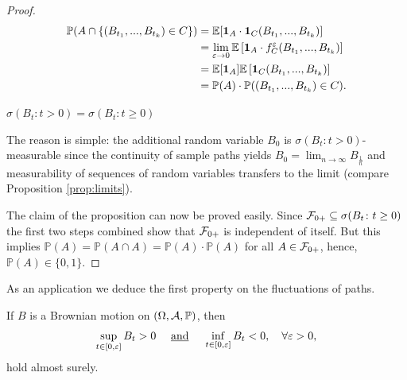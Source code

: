 \begin{proof}[Proof]
	\begin{align*}
		\P(A\cap \{(B_{t_1},...,B_{t_k})\in C\})
		&=\E[ \mathbf 1_A\cdot \mathbf 1_{C}(B_{t_1},...,B_{t_k})]\\
		&=\lim_{\varepsilon \to 0}\E \left[ \mathbf 1_A \cdot f_C^\varepsilon (B_{t_1},...,B_{t_k})\right]\\
		&= \E[\mathbf 1_A] \E \left[ \mathbf 1_C(B_{t_1},...,B_{t_k})\right]\\
		&= \P(A) \cdot \P ((B_{t_1},...,B_{t_k})\in C).
	\end{align*}
	\begin{lstep}
		$\sigma(B_t \colon t > 0)=\sigma(B_t \colon t\geq 0)$
	\end{lstep}
	The reason is simple: the additional random variable $B_0$ is $\sigma(B_t \colon t > 0)$-measurable since the continuity of sample paths yields $B_0 = \lim_{n\to\infty} B_{\frac{1}{n}}$ and measurability of sequences of random variables transfers to the limit (compare Proposition \ref{prop:limits}).\smallskip

	The claim of the proposition can now be proved easily. Since $\cF_{0+}\subseteq \sigma(B_t \colon t\geq 0)$ the first two steps combined show that $\cF_{0+}$ is independent of itself. But this implies $\mathbb{P}(A)= \mathbb{P}(A\cap A) = \mathbb{P}(A)\cdot \mathbb{P}(A)$ for all $A\in \cF_{0+}$, hence, $\mathbb{P}(A)\in \{0,1\}$.
\end{proof}
As an application we deduce the first property on the fluctuations of paths. 
\begin{laussagewerkzeug}
\begin{corollary}\label{kor_sup}
	If $B$ is a Brownian motion on $(\Omega, \mathcal A, \P)$, then
	\begin{align*}
		\sup_{t\in [0,\varepsilon]} B_t > 0\quad \text{ \underline{and} }\quad  \inf_{t \in [0,\varepsilon]} B_t < 0,\quad \forall \varepsilon>0,
	\end{align*}
	hold almost surely.
\end{corollary}
\end{laussagewerkzeug}
